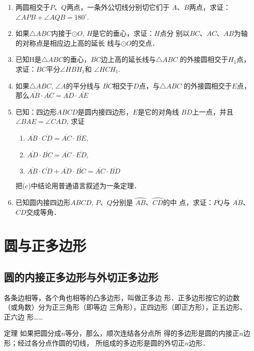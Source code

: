 \begin{enumerate}
  \item 两圆相交于$P$、$Q$两点，一条外公切线分别切它们于
  $A$、$B$两点，求证：$\angle APB+\angle AQB=180^{\circ}$.
  \item 如果$\triangle ABC$内接于$\odot O$, $H$是它的垂心，求证：$H$点分
  别以$BC$、$AC$、$AB$为轴的对称点是相应边上高的延长
  线与$\odot O$的交点．
  \item 已知H是$\triangle ABC$的垂心，$\overline{BC}$边上高的延长线与$\triangle ABC$
  的外接圆相交于$H_1$点，求证：$BC$平分$\angle HBH_1$和
  $\angle HCH_1$.
  \item 如果$\triangle ABC$, $\angle A$的平分线与
  $\overline{BC}$相交于$D$点，与$\triangle ABC$
  的外接圆相交于$E$点，那么$\overline{AB}\cdot \overline{AC}=\overline{AD}\cdot \overline{AE}$
  \item 已知：四边形$ABCD$是圆内接四边形，$E$是它的对角线
  $\overline{BD}$上一点，并且$\angle BAE=\angle CAD$, 求证
\begin{enumerate}
  \item $\overline{AB}\cdot \overline{CD}=\overline{AC}\cdot \overline{BE}$,
  \item $\overline{AD}\cdot \overline{BC}=\overline{AC}\cdot \overline{ED}$,
  \item $\overline{AB}\cdot \overline{CD}+\overline{AD}\cdot \overline{BC}=\overline{AC}\cdot \overline{BD}$
\end{enumerate}
  把(c)中结论用普通语言叙述为一条定理．

\item 已知圆内接四边形$ABCD$, $P$、$Q$分别是
$\wideparen{AB}$、$\wideparen{CD}$的中
点，求证：$\overline{PQ}$与
$\overline{AB}$、$\overline{CD}$交成等角．
\end{enumerate}


\section{圆与正多边形}
\subsection{圆的内接正多边形与外切正多边形}
各条边相等，各个角也相等的凸多边形，叫做正多边
形．正多边形按它的边数（或角数）分为正三角形（即等边
三角形），正四边形（即正方形），正五边形、正六边
形……

\begin{blk}
  {定理} 如果把圆分成$n$等分，那么，顺次连结各分点所
得的多边形是圆的内接正$n$边形；经过各分点作圆的切线，
所组成的多边形是圆的外切正$n$边形．
\end{blk}

